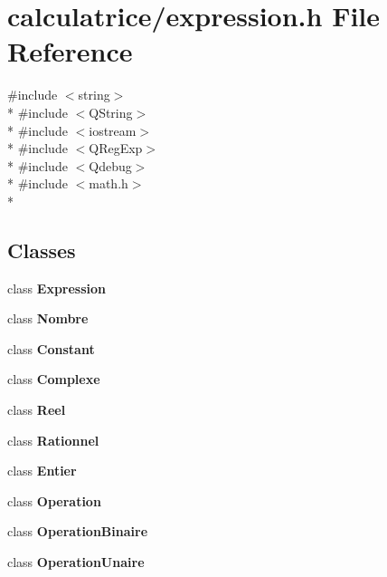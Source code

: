 \section{calculatrice/expression.h File Reference}
\label{expression_8h}
{\ttfamily \#include $<$string$>$}\\*
{\ttfamily \#include $<$Q\-String$>$}\\*
{\ttfamily \#include $<$iostream$>$}\\*
{\ttfamily \#include $<$Q\-Reg\-Exp$>$}\\*
{\ttfamily \#include $<$Qdebug$>$}\\*
{\ttfamily \#include $<$math.\-h$>$}\\*
\subsection*{Classes}
\begin{DoxyCompactItemize}
\item 
class {\bf Expression}
\item 
class {\bf Nombre}
\item 
class {\bf Constant}
\item 
class {\bf Complexe}
\item 
class {\bf Reel}
\item 
class {\bf Rationnel}
\item 
class {\bf Entier}
\item 
class {\bf Operation}
\item 
class {\bf Operation\-Binaire}
\item 
class {\bf Operation\-Unaire}
\end{DoxyCompactItemize}
